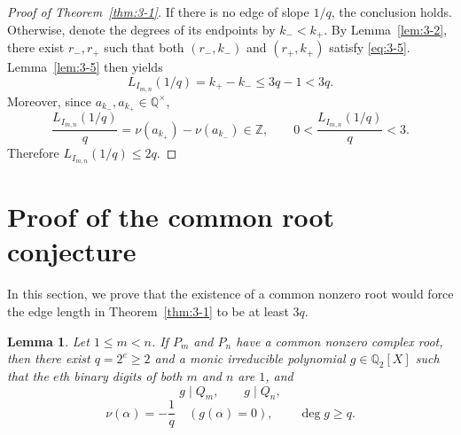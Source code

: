 \documentclass[11pt,a4paper]{article}
\numberwithin{equation}{section}
\newtheorem{lemma}[theorem]{Lemma}
\theoremstyle{definition}
\begin{document}
\begin{proof}[Proof of Theorem~\ref{thm:3-1}]
If there is no edge of slope $1/q$, the conclusion holds. Otherwise, denote the degrees of its endpoints by $k_-<k_+$. By Lemma~\ref{lem:3-2}, there exist $r_-,r_+$ such that both $(r_-,k_-)$ and $(r_+,k_+)$ satisfy \eqref{eq:3-5}. Lemma~\ref{lem:3-5} then yields
\[
L_{I_{m,n}}(1/q)=k_+-k_-\le3q-1<3q.
\]
Moreover, since $a_{k_-},a_{k_+}\in\mathbb Q^\times$,
\[
\frac{L_{I_{m,n}}(1/q)}q
=\nu(a_{k_+})-\nu(a_{k_-})\in\mathbb Z,\qquad
0<\frac{L_{I_{m,n}}(1/q)}q<3.
\]
Therefore $L_{I_{m,n}}(1/q)\le2q$.
\end{proof}

\section{Proof of the common root conjecture}

In this section, we prove that the existence of a common nonzero root would force the edge length in Theorem~\ref{thm:3-1} to be at least $3q$.

\begin{lemma}\label{lem:4-1}
Let $1\le m<n$. If $P_m$ and $P_n$ have a common nonzero complex root, then there exist $q=2^e\ge2$ and a monic irreducible polynomial $g\in\mathbb{Q}_2[X]$ such that the $e$th binary digits of both $m$ and $n$ are $1$, and
\begin{equation}\label{eq:4-1}
g\mid Q_m,\qquad g\mid Q_n,
\end{equation}
\begin{equation}\label{eq:4-2}
\nu(\alpha)=-\frac1q\quad(g(\alpha)=0),
\qquad \deg g\ge q.
\end{equation}
\end{lemma}
\end{document}

